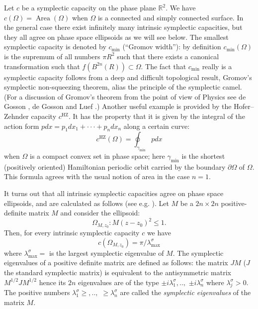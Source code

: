 \documentclass[11pt]{article}%
\begin{document}
Let $c$ be a symplectic capacity on the phase plane $\mathbb{R}^{2}$. We have
$c(\Omega)=\operatorname*{Area}(\Omega)$ when $\Omega$ is a connected and
simply connected surface. In the general case there exist infinitely many
intrinsic symplectic capacities, but they all agree on phase space ellipsoids
as we will see below. The smallest symplectic capacity is denoted by $c_{\min
}$ (\textquotedblleft Gromov width\textquotedblright): by definition $c_{\min
}(\Omega)$ is the supremum of all numbers $\pi R^{2}$ such that there exists a
canonical transformation such that $f(B^{2n}(R))\subset\Omega$. The fact that
$c_{\min}$ really is a symplectic capacity follows from a deep and difficult
topological result, Gromov's \cite{gr85} symplectic non-squeezing theorem,
alias the principle of the symplectic camel. (For a discussion of Gromov's
theorem from the point of view of Physics see de Gosson \cite{go09}, de Gosson
and Luef \cite{goluPR}.) Another useful example is provided by the
Hofer--Zehnder \cite{HZ} capacity $c^{\mathrm{HZ}}$. It has the property that
it is given by the integral of the action form $pdx=p_{1}dx_{1}+\cdot
\cdot\cdot+p_{n}dx_{n}$ along a certain curve:%
\begin{equation}
c^{\text{HZ}}(\Omega)=\oint\nolimits_{\gamma_{\min}}pdx \label{chz}%
\end{equation}
when $\Omega$ is a compact convex set in phase space; here $\gamma_{\min}$ is
the shortest (positively oriented) Hamiltonian periodic orbit carried by the
boundary $\partial\Omega$ of $\Omega$. This formula agrees with the usual
notion of area in the case $n=1$.

It turns out that all intrinsic symplectic capacities agree on phase space
ellipsoids, and are calculated as follows (see e.g. \cite{Birk,goluPR,HZ}).
Let $M$ be a $2n\times2n$ positive-definite matrix $M$ and consider the
ellipsoid:%
\begin{equation}
\Omega_{M,z_{0}}:M(z-z_{0})^{2}\leq1. \label{ellipsoid}%
\end{equation}
Then, for every intrinsic symplectic capacity $c$ we have
\begin{equation}
c(\Omega_{M,z_{0}})=\pi/\lambda_{\max}^{\sigma} \label{capellipse}%
\end{equation}
where $\lambda_{\max}^{\sigma}=$ is the largest symplectic eigenvalue of $M$.
The symplectic eigenvalues of a positive definite matrix are defined as
follows: the matrix $JM$ ($J$ the standard symplectic matrix) is equivalent to
the antisymmetric matrix $M^{1/2}JM^{1/2}$ hence its $2n$ eigenvalues are of
the type $\pm i\lambda_{1}^{\sigma},..,$ $\pm i\lambda_{n}^{\sigma}$ where
$\lambda_{j}^{\sigma}>0$. The positive numbers $\lambda_{1}^{\sigma}\geq,..,$
$\geq\lambda_{n}^{\sigma}$ are called the \emph{symplectic eigenvalues} of the
matrix $M$.
\end{document}
